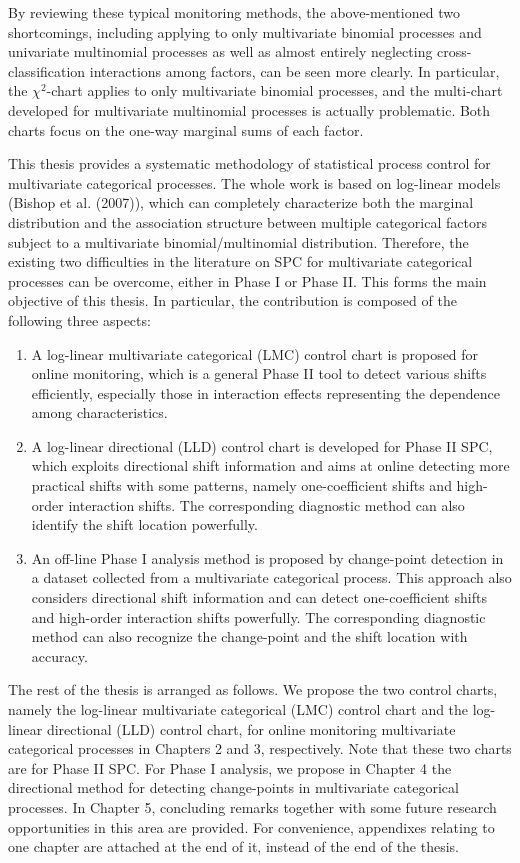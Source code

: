 By reviewing these typical monitoring methods, the above-mentioned two shortcomings,
including applying to only multivariate binomial processes and univariate
multinomial processes as well as almost entirely neglecting cross-classification
interactions among factors, can be seen more clearly. In particular, the
$\chi^2$-chart applies to only multivariate binomial processes, and the multi-chart
developed for multivariate multinomial processes is actually problematic. Both
charts focus on the one-way marginal sums of each factor.

This thesis provides a systematic methodology of statistical process control for
multivariate categorical processes. The whole work is based on log-linear models
(Bishop et al. (2007)), which can completely characterize both the marginal
distribution and the association structure between multiple categorical factors
subject to a multivariate binomial/multinomial distribution. Therefore, the existing
two difficulties in the literature on SPC for multivariate categorical processes can
be overcome, either in Phase I or Phase II. This forms the main objective of this
thesis. In particular, the contribution is composed of the following three aspects:
\begin{enumerate}
\item A log-linear multivariate categorical (LMC) control chart is proposed for
online monitoring, which is a general Phase II tool to detect various shifts
efficiently, especially those in interaction effects representing the dependence
among characteristics.
\item A log-linear directional (LLD) control chart is developed for Phase II SPC,
which exploits directional shift information and aims at online detecting more
practical shifts with some patterns, namely one-coefficient shifts and high-order
interaction shifts. The corresponding diagnostic method can also identify the shift
location powerfully.
\item An off-line Phase I analysis method is proposed by change-point detection
in a dataset collected from a multivariate categorical process. This approach also
considers directional shift information and can detect one-coefficient shifts and
high-order interaction shifts powerfully. The corresponding diagnostic method can
also recognize the change-point and the shift location with accuracy.
\end{enumerate}

The rest of the thesis is arranged as follows. We propose the two control charts,
namely the log-linear multivariate categorical (LMC) control chart and the
log-linear directional (LLD) control chart, for online monitoring multivariate
categorical processes in Chapters 2 and 3, respectively. Note that these two charts
are for Phase II SPC. For Phase I analysis, we propose in Chapter 4 the directional
method for detecting change-points in multivariate categorical processes. In Chapter
5, concluding remarks together with some future research opportunities in this area
are provided. For convenience, appendixes relating to one chapter are attached at
the end of it, instead of the end of the thesis.
